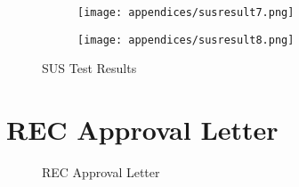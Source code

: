 \clearpage
\begin{figure}[h]
    \centering
    \begin{subfigure}[b]{0.75\textwidth}
        \centering
        \texttt{[image: appendices/susresult7.png]}
        \vspace{0.8cm}
        \label{fig:sub1}
    \end{subfigure}
    \hspace{0.08\textwidth}
    \begin{subfigure}[b]{0.75\textwidth}
        \centering
        \texttt{[image: appendices/susresult8.png]}
        \label{fig:sub2}
    \end{subfigure}
    \caption{SUS Test Results}
    \label{fig:myfig92}
\end{figure}
\clearpage
\chapter{REC Approval Letter}
\begin{figure}[h]
    \centering
    \setlength{\fboxsep}{0pt}
    \caption{REC Approval Letter}
    \label{fig:myfig93}
\end{figure}